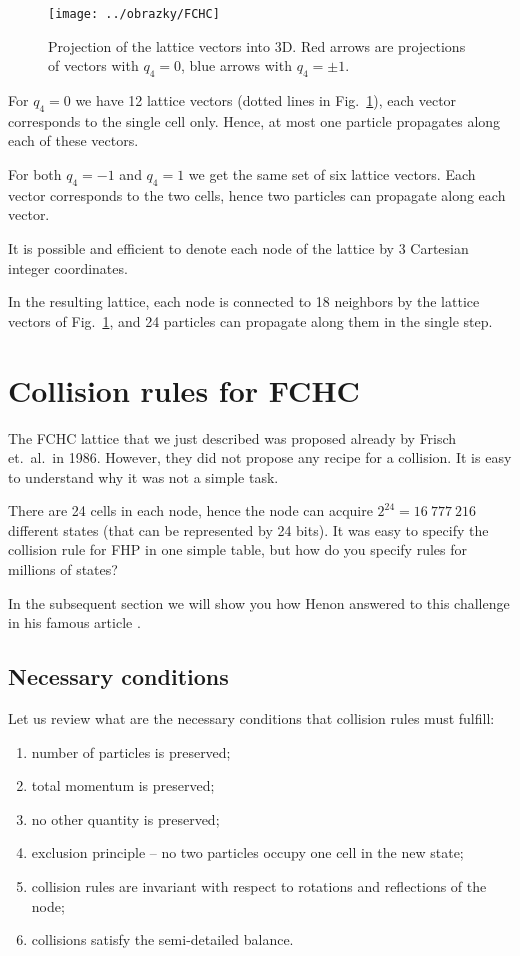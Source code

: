 \begin{figure}
 \centering
 \texttt{[image: ../obrazky/FCHC]}
 \label{fchc}
 \caption{Projection of the lattice vectors into 3D. Red arrows are projections of vectors with $q_4 = 0$,
 blue arrows with $q_4 = \pm 1$.}
\end{figure}

For $q_4 = 0$ we have 12 lattice vectors (dotted lines in Fig.\ \ref{fchc}), each vector corresponds to the single cell only. Hence, at most one particle propagates along each of these vectors.

For both $q_4 = -1$ and $q_4 = 1$ we get the same set of six lattice vectors. Each vector corresponds to the two cells, hence two particles can propagate along each vector.


It is possible and efficient to denote each node of the lattice by 3 Cartesian integer coordinates.


In the resulting lattice, each node is connected to 18 neighbors by the lattice vectors of Fig.\ \ref{fchc}, and 24 particles can propagate along them in the single step.

\section{Collision rules for FCHC}

The FCHC lattice that we just described was proposed already by Frisch et.\ al.\ in 1986.
However, they did not propose any recipe for a collision. It is easy to understand why it was not a simple task.

There are 24 cells in each node, hence the node can acquire $2^{24} = 16~777~216$ different states (that can be represented by 24 bits). It was easy to specify the collision rule for FHP in one simple table, but how do you specify rules for millions of states?

In the subsequent section we will show you how Henon answered to this challenge in his famous article \cite{henon}.

\bigskip

\subsection{Necessary conditions}

Let us review what are the necessary conditions that collision rules must fulfill:

\begin{enumerate}
\item number of particles is preserved;
\item total momentum is preserved;
\item no other quantity is preserved;
\item exclusion principle -- no two particles occupy one cell in the new state;
\item collision rules are invariant with respect to rotations and reflections of the node;
\item collisions satisfy the semi-detailed balance.
\end{enumerate}

